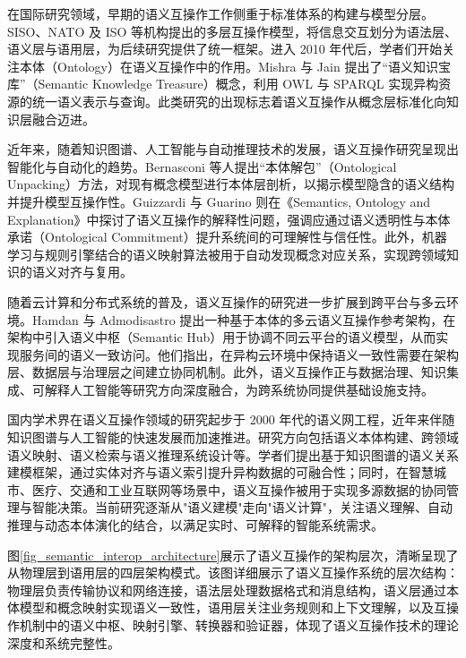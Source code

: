 在国际研究领域，早期的语义互操作工作侧重于标准体系的构建与模型分层。SISO、NATO 及 ISO 等机构提出的多层互操作模型，将信息交互划分为语法层、语义层与语用层\cite{SISO_STD_002_2006,CJCSI_6610_01F_2021}，为后续研究提供了统一框架。进入 2010 年代后，学者们开始关注本体（Ontology）在语义互操作中的作用。Mishra 与 Jain 提出了“语义知识宝库”（Semantic Knowledge Treasure）概念，利用 OWL 与 SPARQL 实现异构资源的统一语义表示与查询\cite{Mishra2018Semantic}。此类研究的出现标志着语义互操作从概念层标准化向知识层融合迈进。

近年来，随着知识图谱、人工智能与自动推理技术的发展，语义互操作研究呈现出智能化与自动化的趋势。Bernasconi 等人提出“本体解包”（Ontological Unpacking）方法，对现有概念模型进行本体层剖析，以揭示模型隐含的语义结构并提升模型互操作性\cite{Bernasconi2022Ontological}。Guizzardi 与 Guarino 则在《Semantics, Ontology and Explanation》中探讨了语义互操作的解释性问题，强调应通过语义透明性与本体承诺（Ontological Commitment）提升系统间的可理解性与信任性\cite{Guizzardi2023Explanation}。此外，机器学习与规则引擎结合的语义映射算法被用于自动发现概念对应关系，实现跨领域知识的语义对齐与复用。

随着云计算和分布式系统的普及，语义互操作的研究进一步扩展到跨平台与多云环境。Hamdan 与 Admodisastro 提出一种基于本体的多云语义互操作参考架构，在架构中引入语义中枢（Semantic Hub）用于协调不同云平台的语义模型，从而实现服务间的语义一致访问\cite{Hamdan2023Reference,SemanticMultiCloud2024}。他们指出，在异构云环境中保持语义一致性需要在架构层、数据层与治理层之间建立协同机制。此外，语义互操作正与数据治理、知识集成、可解释人工智能等研究方向深度融合，为跨系统协同提供基础设施支持。

国内学术界在语义互操作领域的研究起步于 2000 年代的语义网工程，近年来伴随知识图谱与人工智能的快速发展而加速推进。研究方向包括语义本体构建、跨领域语义映射、语义检索与语义推理系统设计等。学者们提出基于知识图谱的语义关系建模框架，通过实体对齐与语义索引提升异构数据的可融合性；同时，在智慧城市、医疗、交通和工业互联网等场景中，语义互操作被用于实现多源数据的协同管理与智能决策。当前研究逐渐从"语义建模"走向"语义计算"，关注语义理解、自动推理与动态本体演化的结合，以满足实时、可解释的智能系统需求。

图\ref{fig_semantic_interop_architecture}展示了语义互操作的架构层次，清晰呈现了从物理层到语用层的四层架构模式。该图详细展示了语义互操作系统的层次结构：物理层负责传输协议和网络连接，语法层处理数据格式和消息结构，语义层通过本体模型和概念映射实现语义一致性，语用层关注业务规则和上下文理解，以及互操作机制中的语义中枢、映射引擎、转换器和验证器，体现了语义互操作技术的理论深度和系统完整性。


